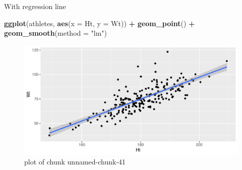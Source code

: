 \documentclass[ignorenonframetext,]{beamer}
\newenvironment{Shaded}{\begin{snugshade}}{\end{snugshade}}
\newcommand{\DataTypeTok}[1]{\textcolor[rgb]{0.13,0.29,0.53}{#1}}
\newcommand{\KeywordTok}[1]{\textcolor[rgb]{0.13,0.29,0.53}{\textbf{#1}}}
\newcommand{\NormalTok}[1]{#1}
\newcommand{\OperatorTok}[1]{\textcolor[rgb]{0.81,0.36,0.00}{\textbf{#1}}}
\newcommand{\StringTok}[1]{\textcolor[rgb]{0.31,0.60,0.02}{#1}}
\begin{document}
\begin{frame}[fragile]{With regression line}
\protect\hypertarget{with-regression-line}{}

\begin{Shaded}
\begin{Highlighting}[]
\KeywordTok{ggplot}\NormalTok{(athletes, }\KeywordTok{aes}\NormalTok{(}\DataTypeTok{x =}\NormalTok{ Ht, }\DataTypeTok{y =}\NormalTok{ Wt)) }\OperatorTok{+}
\StringTok{  }\KeywordTok{geom_point}\NormalTok{() }\OperatorTok{+}\StringTok{ }\KeywordTok{geom_smooth}\NormalTok{(}\DataTypeTok{method =} \StringTok{"lm"}\NormalTok{)}
\end{Highlighting}
\end{Shaded}

\begin{figure}
\centering
\includegraphics{figure/unnamed-chunk-41-1.pdf}
\caption{plot of chunk unnamed-chunk-41}
\end{figure}

\end{frame}
\end{document}
